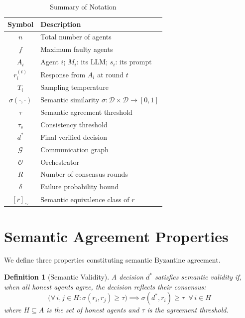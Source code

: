\documentclass[journal,10pt]{IEEEtran}
\newtheorem{definition}{Definition}
\newcommand{\calD}{\mathcal{D}}
\newcommand{\calG}{\mathcal{G}}
\newcommand{\calO}{\mathcal{O}}
\begin{document}
\begin{table}[t]
\centering
\caption{Summary of Notation}
\label{tab:notation}
\renewcommand{\arraystretch}{1.1}
\scriptsize
\begin{tabular}{@{}c l@{}}
\toprule
\textbf{Symbol} & \textbf{Description} \\
\midrule
$n$ & Total number of agents \\
$f$ & Maximum faulty agents \\
$A_i$ & Agent $i$; $M_i$: its LLM; $s_i$: its prompt \\
$r_i^{(t)}$ & Response from $A_i$ at round $t$ \\
$T_i$ & Sampling temperature \\
$\sigma(\cdot,\cdot)$ & Semantic similarity $\sigma: \calD \times \calD \to [0,1]$ \\
$\tau$ & Semantic agreement threshold \\
$\tau_s$ & Consistency threshold \\
$d^*$ & Final verified decision \\
$\calG$ & Communication graph \\
$\calO$ & Orchestrator \\
$R$ & Number of consensus rounds \\
$\delta$ & Failure probability bound \\
$[r]_\sim$ & Semantic equivalence class of $r$ \\
\bottomrule
\end{tabular}
\end{table}

\section{Semantic Agreement Properties}\label{sec:properties}

We define three properties constituting semantic Byzantine agreement.

\begin{definition}[Semantic Validity]\label{def:sv}
A decision $d^*$ satisfies semantic validity if, when all honest agents agree, the decision reflects their consensus:
\begin{equation}\label{eq:sv}
\Big(\forall\, i,j \in H: \sigma(r_i, r_j) \geq \tau\Big) \implies \sigma(d^*, r_i) \geq \tau \;\; \forall\, i \in H
\end{equation}
where $H \subseteq A$ is the set of honest agents and $\tau$ is the agreement threshold.
\end{definition}
\end{document}
